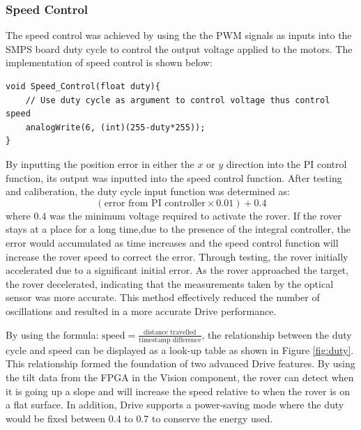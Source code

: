 \documentclass[11pt, a4paper]{article}
\begin{document}
\subsubsection{Speed Control}

The speed control was achieved by using the the PWM signals as inputs into the SMPS board duty cycle to control the output voltage applied to the motors. The implementation of speed control is shown below:

\begin{lstlisting}
void Speed_Control(float duty){
    // Use duty cycle as argument to control voltage thus control speed
    analogWrite(6, (int)(255-duty*255)); 
}
\end{lstlisting}

By inputting the position error in either the $x$ or $y$ direction into the PI control function, its output was  inputted into the speed control function. After testing and caliberation, the duty cycle input function was determined as:
$$
    (\text{error from PI controller} \times 0.01) + 0.4
$$
where $0.4$ was the minimum voltage required to activate the rover. If the rover stays at a place for a long time,due to the presence of the integral controller, the error would accumulated as time increases and the speed control function will increase the rover speed to correct the error. Through testing, the rover initially accelerated due to a significant initial error. As the rover approached the target, the rover decelerated, indicating that the measurements taken by the optical sensor was more accurate. This method effectively reduced the number of oscillations and resulted in a more accurate Drive performance.

By using the formula: $\text{speed} = \frac{\text{distance travelled}}{\text{timestamp difference}}$, the relationship between the duty cycle and speed can be displayed as a look-up table as shown in Figure \ref{fig:duty}. This relationship formed the foundation of two advanced Drive features. By using the tilt data from the FPGA in the Vision component, the rover can detect when it is going up a slope and will increase the speed relative to when the rover is on a flat surface. In addition, Drive supports a power-saving mode where the duty would be fixed between 0.4 to 0.7 to conserve the energy used.

\pagebreak
\end{document}
